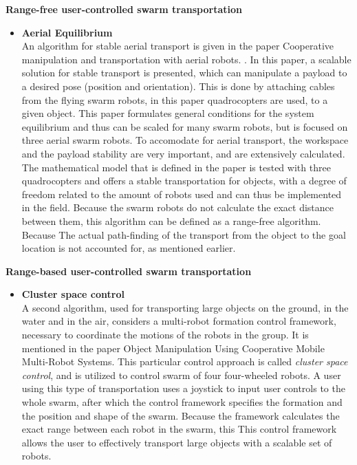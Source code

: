 \textbf{Range-free user-controlled swarm transportation}
\begin{itemize}
\item \textbf{Aerial Equilibrium}\\
An algorithm for stable aerial transport is given in the paper Cooperative manipulation and transportation with aerial robots. \cite{Michael2011}. 
In this paper, a scalable solution for stable transport is presented, which can manipulate a payload to a desired pose (position and orientation).
This is done by attaching cables from the flying swarm robots, in this paper quadrocopters are used, to a given object. 
This paper formulates general conditions for the system equilibrium and thus can be scaled for many swarm robots, but is focused on three aerial swarm robots. 
To accomodate for aerial transport, the workspace and the payload stability are very important, and are extensively calculated. 
The mathematical model that is defined in the paper is tested with three quadrocopters and offers a stable transportation for objects, with a degree of freedom related to the amount of robots used and can thus be implemented in the field.
Because the swarm robots do not calculate the exact distance between them, this algorithm can be defined as a range-free algorithm. Because
The actual path-finding of the transport from the object to the goal location is not accounted for, as mentioned earlier.  \\
\end{itemize}

\textbf{Range-based user-controlled swarm transportation}
\begin{itemize} 
\item \textbf{Cluster space control}\\
A second algorithm, used for transporting large objects on the ground, in the water and in the air, considers a multi-robot formation control framework, necessary to coordinate the motions of the robots in the group. 
It is mentioned in the paper Object Manipulation Using Cooperative Mobile Multi-Robot Systems. \cite{Mas2012}
This particular control approach is called \emph{cluster space control}, and is utilized to control swarm of four four-wheeled robots. 
A user using this type of transportation uses a joystick to input user controls to the whole swarm, after which the control framework specifies the formation and the position and shape of the swarm.
Because the framework calculates the exact range between each robot in the swarm, this 
This control framework allows the user to effectively transport large objects with a scalable set of robots. \\
\end{itemize}

